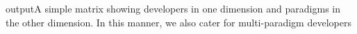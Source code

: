 output{A simple matrix showing developers in one dimension and paradigms in the other dimension.
In this manner, we also cater for multi-paradigm developers}

